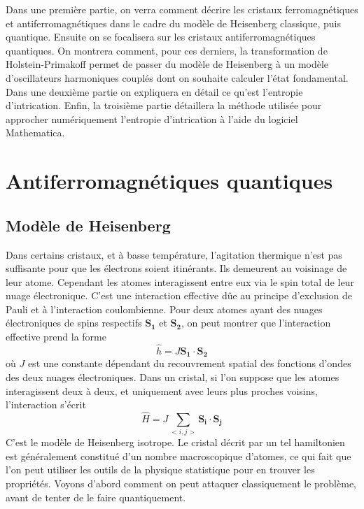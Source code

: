 \documentclass[a4paper, french]{report}
\newcommand{\h}{\ensuremath{\hat{H}}\xspace}
\newcommand{\1}{\ensuremath{\ket{\om_1\bom_1}}\xspace}
\newcommand{\2}{\ensuremath{\ket{\om_2\bom_2}}\xspace}
\begin{document}
Dans une première partie, on verra comment décrire les cristaux ferromagnétiques et antiferromagnétiques dans le cadre du modèle de Heisenberg classique, puis quantique. Ensuite on se focalisera sur les cristaux antiferromagnétiques quantiques. On montrera comment, pour ces derniers, la transformation de Holstein-Primakoff permet de passer du modèle de Heisenberg à un modèle d'oscillateurs harmoniques couplés dont on souhaite calculer l'état fondamental.
Dans une deuxième partie on expliquera en détail ce qu'est l'entropie d'intrication.
Enfin, la troisième partie détaillera la méthode utilisée pour approcher numériquement l'entropie d'intrication à l'aide du logiciel Mathematica.

\tableofcontents

\chapter{Antiferromagnétiques quantiques}
\section{Modèle de Heisenberg}

Dans certains cristaux, et à basse température, l'agitation thermique n'est pas suffisante pour que les électrons soient itinérants. Ils demeurent au voisinage de leur atome. Cependant les atomes interagissent entre eux via le spin total de leur nuage électronique. C'est une interaction effective dûe au principe d'exclusion de Pauli et à l'interaction coulombienne. Pour deux atomes ayant des nuages électroniques de spins respectifs $\mathbf{S_1}$ et $\mathbf{S_2}$, on peut montrer que l'interaction effective prend la forme 
\begin{equation}
	\hat h=J\mathbf{S_1}\cdot \mathbf{S_2}
\end{equation}
où $J$ est une constante dépendant du recouvrement spatial des fonctions d'ondes des deux nuages électroniques.
Dans un cristal, si l'on suppose que les atomes interagissent deux à deux, et uniquement avec leurs plus proches voisins, l'interaction s'écrit
\begin{equation}
\label{eq:heis}
	\h=J\sum_{<i,j>}\mathbf{S_i\cdot S_j}
\end{equation}
C'est le modèle de Heisenberg isotrope. Le cristal décrit par un tel hamiltonien est généralement constitué d'un nombre macroscopique d'atomes, ce qui fait que l'on peut utiliser les outils de la physique statistique pour en trouver les propriétés. Voyons d'abord comment on peut attaquer classiquement le problème, avant de tenter de le faire quantiquement.
\end{document}
